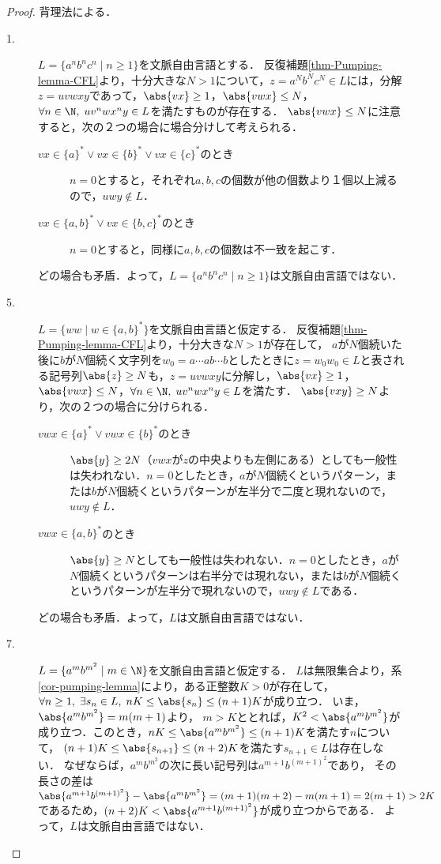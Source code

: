 \begin{proof}
    背理法による．
    \begin{description}
        \item[1.] $L=\{a^nb^nc^n\mid n\ge 1\}$を文脈自由言語とする．
        反復補題\ref{thm-Pumping-lemma-CFL}より，十分大きな$N>1$について，$z=a^Nb^Nc^N\in L$には，分解$z=uvwxy$であって，$\abs{vx}\ge 1$，$\abs{vwx}\le N$，$\forall n\in\N,\;uv^nwx^ny\in L$を満たすものが存在する．
        $\abs{vwx}\le N$に注意すると，次の２つの場合に場合分けして考えられる．
        \begin{description}
            \item[$vx\in\{a\}^*\lor vx\in\{b\}^*\lor vx\in\{c\}^*$のとき] $n=0$とすると，それぞれ$a,b,c$の個数が他の個数より１個以上減るので，$uwy\notin L$．
            \item[$vx\in\{a,b\}^*\lor vx\in\{b,c\}^*$のとき] $n=0$とすると，同様に$a,b,c$の個数は不一致を起こす．
        \end{description}
        どの場合も矛盾．よって，$L=\{a^nb^nc^n\mid n\ge 1\}$は文脈自由言語ではない．
        \item[5.]
        $L=\{ww\mid w\in\{a,b\}^*\}$を文脈自由言語と仮定する．
        反復補題\ref{thm-Pumping-lemma-CFL}より，十分大きな$N>1$が存在して，
        $a$が$N$個続いた後に$b$が$N$個続く文字列を$w_0=a\cdots ab\cdots b$としたときに$z=w_0w_0\in L$と表される記号列$\abs{z}\ge N$も，$z=uvwxy$に分解し，$\abs{vx}\ge 1$，$\abs{vwx}\le N$，$\forall n\in\N,\;uv^nwx^ny\in L$を満たす．
        $\abs{vxy}\ge N$より，次の２つの場合に分けられる．
        \begin{description}
            \item[$vwx\in\{a\}^*\lor vwx\in\{b\}^*$のとき] $\abs{y}\ge 2N$（$vwx$が$z$の中央よりも左側にある）としても一般性は失われない．$n=0$としたとき，$a$が$N$個続くというパターン，または$b$が$N$個続くというパターンが左半分で二度と現れないので，$uwy\notin L$．
            \item[$vwx\in\{a,b\}^*$のとき] $\abs{y}\ge N$としても一般性は失われない．$n=0$としたとき，$a$が$N$個続くというパターンは右半分では現れない，または$b$が$N$個続くというパターンが左半分で現れないので，$uwy\notin L$である．
        \end{description}
        どの場合も矛盾．よって，$L$は文脈自由言語ではない．
        \item[7.] $L=\{a^mb^{m^2}\mid m\in\N\}$を文脈自由言語と仮定する．
        $L$は無限集合より，系\ref{cor-pumping-lemma}により，ある正整数$K>0$が存在して，
        $\forall n\ge 1,\;\exists s_n\in L,\;nK\le\abs{s_n}\le(n+1)K$が成り立つ．
        いま，$\abs{a^mb^{m^2}}=m(m+1)$より，
        $m>K$ととれば，$K^2<\abs{a^mb^{m^2}}$が成り立つ．このとき，$nK\le \abs{a^mb^{m^2}}\le(n+1)K$を満たす$n$について，
        $(n+1)K\le\abs{s_{n+1}}\le(n+2)K$を満たす$s_{n+1}\in L$は存在しない．
        なぜならば，$a^mb^{m^2}$の次に長い記号列は$a^{m+1}b^{(m+1)^2}$であり，
        その長さの差は$\abs{a^{m+1}b^{(m+1)^2}}-\abs{a^mb^{m^2}}=(m+1)(m+2)-m(m+1)=2(m+1)>2K$であるため，$(n+2)K<\abs{a^{m+1}b^{(m+1)^2}}$が成り立つからである．
        よって，$L$は文脈自由言語ではない．
    \end{description}
\end{proof}
